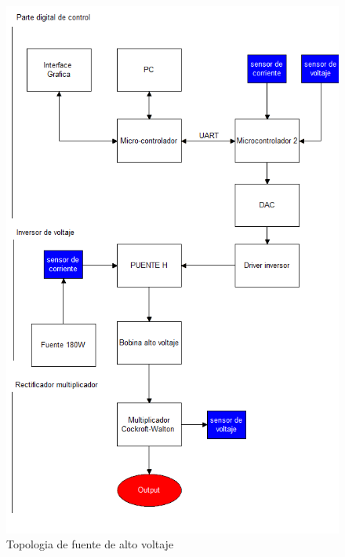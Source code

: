 \begin{figure}[H]
\centering
\includegraphics[width=12
cm]{Capitulo3/figs/figura1.png}
\caption{Topologia de fuente de alto voltaje}
\end{figure}







